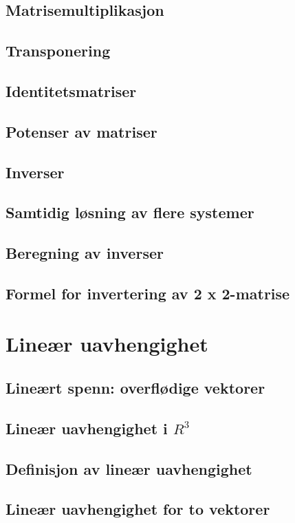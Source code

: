 \documentclass{article}
\begin{document}
\subsection{Matrisemultiplikasjon}
\subsection{Transponering}
\subsection{Identitetsmatriser}
\subsection{Potenser av matriser}
\subsection{Inverser}
\subsection{Samtidig løsning av flere systemer}
\subsection{Beregning av inverser}
\subsection{Formel for invertering av 2 x 2-matrise}


\section{Lineær uavhengighet}

\subsection{Lineært spenn: overflødige vektorer}
\subsection{Lineær uavhengighet i $R^3$}
\subsection{Definisjon av lineær uavhengighet}
\subsection{Lineær uavhengighet for to vektorer}
\end{document}
